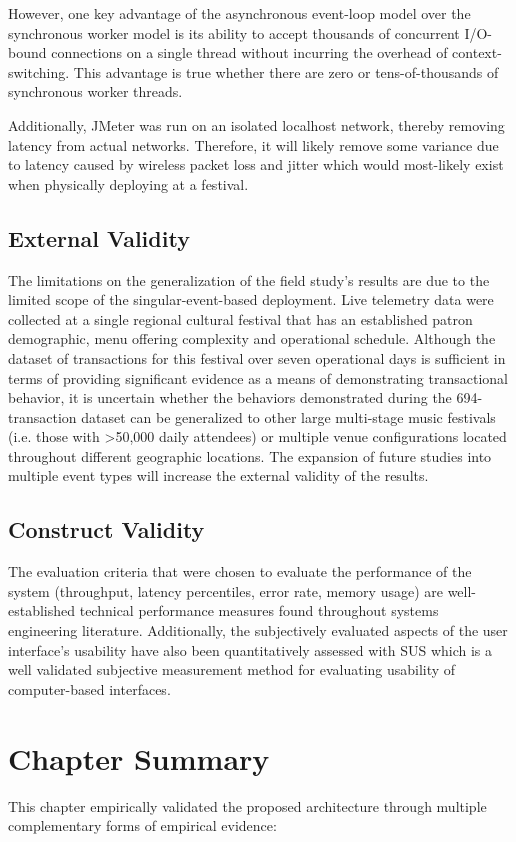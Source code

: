 However, one key advantage of the asynchronous event-loop model over the synchronous worker model is its ability to accept thousands of concurrent I/O-bound connections on a single thread without incurring the overhead of context-switching. This advantage is true whether there are zero or tens-of-thousands of synchronous worker threads.

Additionally, JMeter was run on an isolated localhost network, thereby removing latency from actual networks. Therefore, it will likely remove some variance due to latency caused by wireless packet loss and jitter which would most-likely exist when physically deploying at a festival.
\subsection{External Validity}
The limitations on the generalization of the field study's results are due to the limited scope of the singular-event-based deployment. Live telemetry data were collected at a single regional cultural festival that has an established patron demographic, menu offering complexity and operational schedule. Although the dataset of transactions for this festival over seven operational days is sufficient in terms of providing significant evidence as a means of demonstrating transactional behavior, it is uncertain whether the behaviors demonstrated during the 694-transaction dataset can be generalized to other large multi-stage music festivals (i.e. those with >50,000 daily attendees) or multiple venue configurations located throughout different geographic locations. The expansion of future studies into multiple event types will increase the external validity of the results.
\subsection{Construct Validity}
The evaluation criteria that were chosen to evaluate the performance of the system (throughput, latency percentiles, error rate, memory usage) are well-established technical performance measures found throughout systems engineering literature. Additionally, the subjectively evaluated aspects of the user interface's usability have also been quantitatively assessed with SUS \cite{brooke1996sus} which is a well validated subjective measurement method for evaluating usability of computer-based interfaces.
\section{Chapter Summary}
This chapter empirically validated the proposed architecture through multiple complementary forms of empirical evidence:

